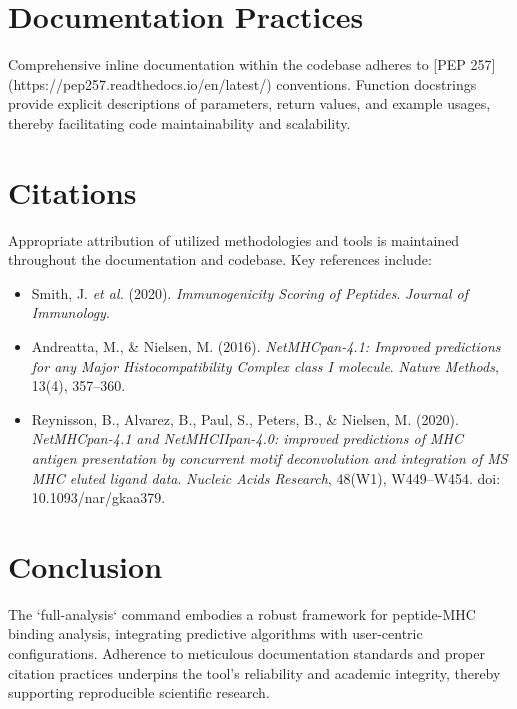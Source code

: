 \documentclass{article}
\begin{document}
\section{Documentation Practices}
Comprehensive inline documentation within the codebase adheres to [PEP 257](https://pep257.readthedocs.io/en/latest/) conventions. Function docstrings provide explicit descriptions of parameters, return values, and example usages, thereby facilitating code maintainability and scalability.

\section{Citations}
Appropriate attribution of utilized methodologies and tools is maintained throughout the documentation and codebase. Key references include:
\begin{itemize}
    \item Smith, J. \textit{et al.} (2020). \textit{Immunogenicity Scoring of Peptides}. \textit{Journal of Immunology}.
    \item Andreatta, M., \& Nielsen, M. (2016). \textit{NetMHCpan-4.1: Improved predictions for any Major Histocompatibility Complex class I molecule}. \textit{Nature Methods}, 13(4), 357--360.
    \item Reynisson, B., Alvarez, B., Paul, S., Peters, B., \& Nielsen, M. (2020). \textit{NetMHCpan-4.1 and NetMHCIIpan-4.0: improved predictions of MHC antigen presentation by concurrent motif deconvolution and integration of MS MHC eluted ligand data}. \textit{Nucleic Acids Research}, 48(W1), W449--W454. doi: 10.1093/nar/gkaa379.
\end{itemize}

\section{Conclusion}
The `full-analysis` command embodies a robust framework for peptide-MHC binding analysis, integrating predictive algorithms with user-centric configurations. Adherence to meticulous documentation standards and proper citation practices underpins the tool's reliability and academic integrity, thereby supporting reproducible scientific research.



\end{document}
